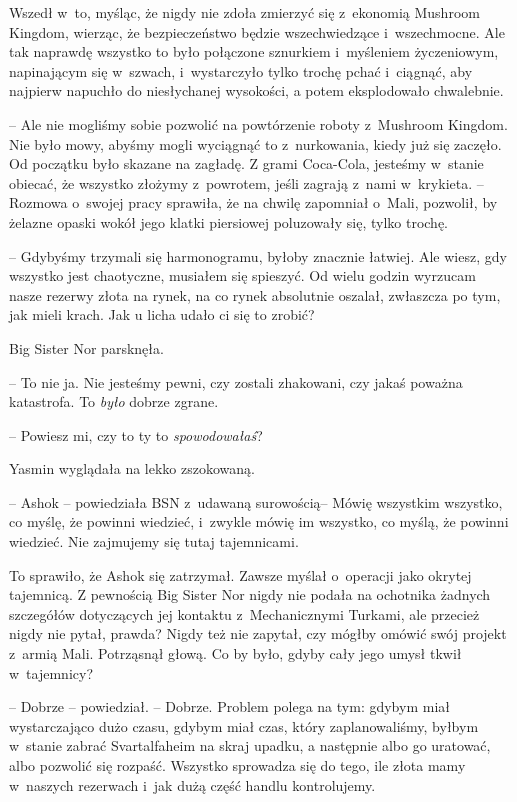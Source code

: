 \documentclass[oneside,polish,11pt,rmheadings]{mwbk}
\begin{document}
Wszedł w~to, myśląc, że nigdy nie zdoła zmierzyć się z~ekonomią Mushroom Kingdom, wierząc, że bezpieczeństwo będzie wszechwiedzące i~wszechmocne. Ale tak naprawdę wszystko to było połączone sznurkiem i~myśleniem życzeniowym, napinającym się w~szwach, i~wystarczyło tylko trochę pchać i~ciągnąć, aby najpierw napuchło do niesłychanej wysokości, a potem eksplodowało chwalebnie.

-- Ale nie mogliśmy sobie pozwolić na powtórzenie roboty z~Mushroom Kingdom. Nie było mowy, abyśmy mogli wyciągnąć to z~nurkowania, kiedy już się zaczęło. Od początku było skazane na zagładę. Z grami Coca-Cola, jesteśmy w~stanie obiecać, że wszystko złożymy z~powrotem, jeśli zagrają z~nami w~krykieta. -- Rozmowa o~swojej pracy sprawiła, że na chwilę zapomniał o~Mali, pozwolił, by żelazne opaski wokół jego klatki piersiowej poluzowały się, tylko trochę.

-- Gdybyśmy trzymali się harmonogramu, byłoby znacznie łatwiej. Ale wiesz, gdy wszystko jest chaotyczne, musiałem się spieszyć. Od wielu godzin wyrzucam nasze rezerwy złota na rynek, na co rynek absolutnie oszalał, zwłaszcza po tym, jak mieli krach. Jak u licha udało ci się to zrobić?

Big Sister Nor parsknęła. 

-- To nie ja. Nie jesteśmy pewni, czy zostali zhakowani, czy jakaś poważna katastrofa. To \textit{było} dobrze zgrane.

-- Powiesz mi, czy to ty to \textit{spowodowałaś}?

Yasmin wyglądała na lekko zszokowaną.

-- Ashok -- powiedziała BSN z~udawaną surowością-- Mówię wszystkim wszystko, co myślę, że powinni wiedzieć, i~zwykle mówię im wszystko, co myślą, że powinni wiedzieć. Nie zajmujemy się tutaj tajemnicami.

To sprawiło, że Ashok się zatrzymał. Zawsze myślał o~operacji jako okrytej tajemnicą. Z pewnością Big Sister Nor nigdy nie podała na ochotnika żadnych szczegółów dotyczących jej kontaktu z~Mechanicznymi Turkami, ale przecież nigdy nie pytał, prawda? Nigdy też nie zapytał, czy mógłby omówić swój projekt z~armią Mali. Potrząsnął głową. Co by było, gdyby cały jego umysł tkwił w~tajemnicy?

-- Dobrze -- powiedział. -- Dobrze. Problem polega na tym: gdybym miał wystarczająco dużo czasu, gdybym miał czas, który zaplanowaliśmy, byłbym w~stanie zabrać Svartalfaheim na skraj upadku, a następnie albo go uratować, albo pozwolić się rozpaść. Wszystko sprowadza się do tego, ile złota mamy w~naszych rezerwach i~jak dużą część handlu kontrolujemy.
\end{document}
